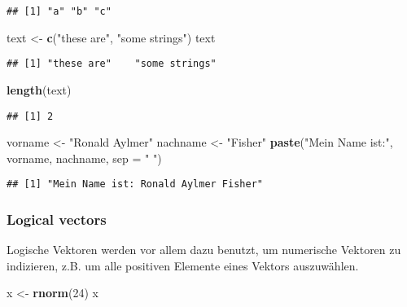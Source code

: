 \documentclass[
]{article}
\newenvironment{Shaded}{\begin{snugshade}}{\end{snugshade}}
\newcommand{\AttributeTok}[1]{\textcolor[rgb]{0.13,0.29,0.53}{#1}}
\newcommand{\DecValTok}[1]{\textcolor[rgb]{0.00,0.00,0.81}{#1}}
\newcommand{\FunctionTok}[1]{\textcolor[rgb]{0.13,0.29,0.53}{\textbf{#1}}}
\newcommand{\NormalTok}[1]{#1}
\newcommand{\OtherTok}[1]{\textcolor[rgb]{0.56,0.35,0.01}{#1}}
\newcommand{\StringTok}[1]{\textcolor[rgb]{0.31,0.60,0.02}{#1}}
\begin{document}
\begin{verbatim}
## [1] "a" "b" "c"
\end{verbatim}

\begin{Shaded}
\begin{Highlighting}[]
\NormalTok{text }\OtherTok{\textless{}{-}} \FunctionTok{c}\NormalTok{(}\StringTok{"these are"}\NormalTok{, }\StringTok{"some strings"}\NormalTok{)}
\NormalTok{text}
\end{Highlighting}
\end{Shaded}

\begin{verbatim}
## [1] "these are"    "some strings"
\end{verbatim}

\begin{Shaded}
\begin{Highlighting}[]
\FunctionTok{length}\NormalTok{(text)}
\end{Highlighting}
\end{Shaded}

\begin{verbatim}
## [1] 2
\end{verbatim}

\begin{Shaded}
\begin{Highlighting}[]
\NormalTok{vorname }\OtherTok{\textless{}{-}} \StringTok{"Ronald Aylmer"}
\NormalTok{nachname }\OtherTok{\textless{}{-}} \StringTok{"Fisher"}
\FunctionTok{paste}\NormalTok{(}\StringTok{"Mein Name ist:"}\NormalTok{, vorname, nachname, }\AttributeTok{sep =} \StringTok{" "}\NormalTok{)}
\end{Highlighting}
\end{Shaded}

\begin{verbatim}
## [1] "Mein Name ist: Ronald Aylmer Fisher"
\end{verbatim}

\hypertarget{logical-vectors}{%
\subsubsection{Logical vectors}\label{logical-vectors}}

Logische Vektoren werden vor allem dazu benutzt, um numerische Vektoren
zu indizieren, z.B. um alle positiven Elemente eines Vektors
auszuwählen.

\begin{Shaded}
\begin{Highlighting}[]
\NormalTok{x }\OtherTok{\textless{}{-}} \FunctionTok{rnorm}\NormalTok{(}\DecValTok{24}\NormalTok{)}
\NormalTok{x}
\end{Highlighting}
\end{Shaded}
\end{document}
